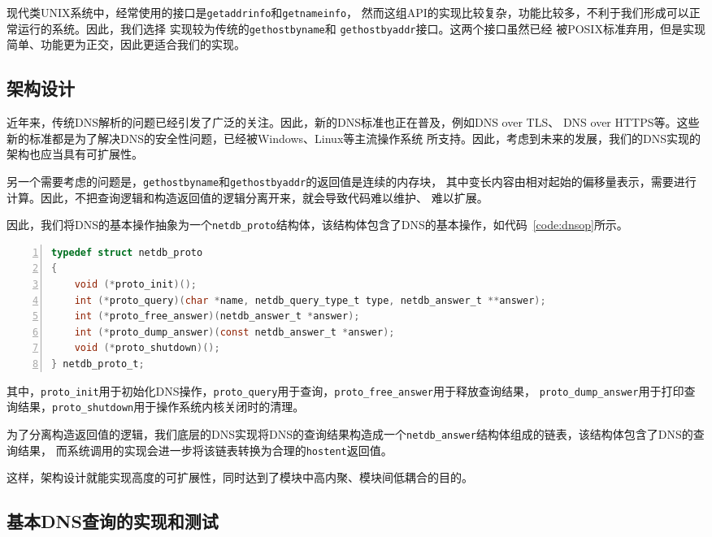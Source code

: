 \documentclass[a4paper,twoside]{ctexrep}
\begin{document}
\begin{spacing}{1.2}
现代类UNIX系统中，经常使用的接口是\texttt{getaddrinfo}和\texttt{getnameinfo}，
然而这组API的实现比较复杂，功能比较多，不利于我们形成可以正常运行的系统。因此，我们选择
实现较为传统的\texttt{gethostbyname}和
\texttt{gethostbyaddr}接口。这两个接口虽然已经
被POSIX标准弃用，但是实现简单、功能更为正交，因此更适合我们的实现。

\subsection{架构设计}

近年来，传统DNS解析的问题已经引发了广泛的关注。因此，新的DNS标准也正在普及，例如DNS over TLS、
DNS over HTTPS等。这些新的标准都是为了解决DNS的安全性问题，已经被Windows、Linux等主流操作系统
所支持。因此，考虑到未来的发展，我们的DNS实现的架构也应当具有可扩展性。

另一个需要考虑的问题是，\texttt{gethostbyname}和\texttt{gethostbyaddr}的返回值是连续的内存块，
其中变长内容由相对起始的偏移量表示，需要进行计算。因此，不把查询逻辑和构造返回值的逻辑分离开来，就会导致代码难以维护、
难以扩展。

因此，我们将DNS的基本操作抽象为一个\texttt{netdb\_proto}结构体，该结构体包含了DNS的基本操作，如代码~\ref{code:dnsop}所示。
\begin{lstlisting}[numbers=left,style=CppStyle,caption={DNS操作结构体},label={code:dnsop},language=C]
typedef struct netdb_proto
{
	void (*proto_init)();
	int (*proto_query)(char *name, netdb_query_type_t type, netdb_answer_t **answer);
	int (*proto_free_answer)(netdb_answer_t *answer);
	int (*proto_dump_answer)(const netdb_answer_t *answer);
	void (*proto_shutdown)();
} netdb_proto_t;
\end{lstlisting}
其中，\texttt{proto\_init}用于初始化DNS操作，\texttt{proto\_query}用于查询，\texttt{proto\_free\_answer}用于释放查询结果，
\texttt{proto\_dump\_answer}用于打印查询结果，\texttt{proto\_shutdown}用于操作系统内核关闭时的清理。

为了分离构造返回值的逻辑，我们底层的DNS实现将DNS的查询结果构造成一个\texttt{netdb\_answer}结构体组成的链表，该结构体包含了DNS的查询结果，
而系统调用的实现会进一步将该链表转换为合理的\texttt{hostent}返回值。

这样，架构设计就能实现高度的可扩展性，同时达到了模块中高内聚、模块间低耦合的目的。

\subsection{基本DNS查询的实现和测试}


\end{spacing}
\end{document}

